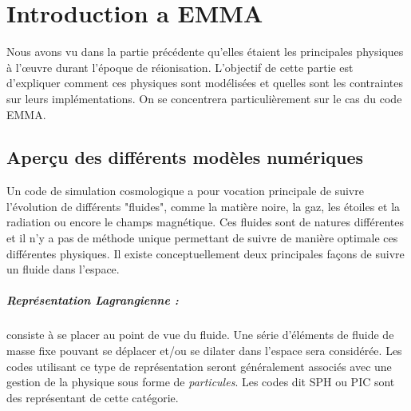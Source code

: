 \chapter{Introduction a EMMA}
\label{ch:introduction}


Nous avons vu dans la partie précédente qu'elles étaient les principales physiques à l’œuvre durant l'époque de réionisation.
L'objectif de cette partie est d'expliquer comment ces physiques sont modélisées et quelles sont les contraintes sur leurs implémentations.
On se concentrera particulièrement sur le cas du code EMMA.



\section{Aperçu des différents modèles numériques}

Un code de simulation cosmologique a pour vocation principale de suivre l'évolution de différents "fluides", comme la matière noire, la gaz, les étoiles et la radiation ou encore le champs magnétique.
Ces fluides sont de natures différentes et il n'y a pas de méthode unique permettant de suivre de manière optimale ces différentes physiques.
Il existe conceptuellement deux principales façons de suivre un fluide dans l'espace.

\paragraph{Représentation Lagrangienne : } 
consiste à se placer au point de vue du fluide.
Une série d'éléments de fluide de masse fixe pouvant se déplacer et/ou se dilater dans l'espace sera considérée.
Les codes utilisant ce type de représentation seront généralement associés avec une gestion de la physique sous forme de \emph{particules}.
Les codes dit \ac{SPH} ou \ac{PIC} sont des représentant de cette catégorie.

